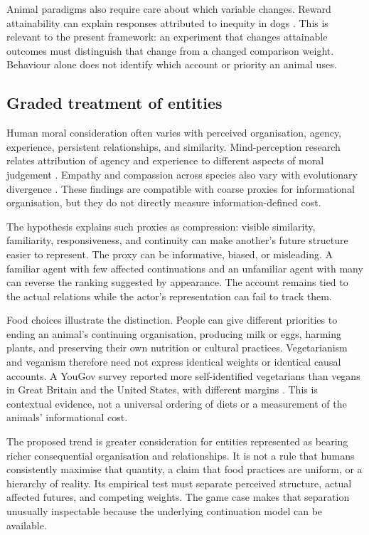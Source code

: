 \documentclass[11pt,a4paper]{article}
\theoremstyle{remark}
\begin{document}
Animal paradigms also require care about which variable changes. Reward
attainability can explain responses attributed to inequity in dogs
\citep{mcgetrick2023attainability}. This is relevant to the present framework:
an experiment that changes attainable outcomes must distinguish that change
from a changed comparison weight. Behaviour alone does not identify which
account or priority an animal uses.

\subsection{Graded treatment of entities}

Human moral consideration often varies with perceived organisation, agency,
experience, persistent relationships, and similarity. Mind-perception research
relates attribution of agency and experience to different aspects of moral
judgement \citep{gray2007mindperception}. Empathy and compassion across species
also vary with evolutionary divergence \citep{miralles2019empathy}. These findings
are compatible with coarse proxies for informational organisation, but they do
not directly measure information-defined cost.

The hypothesis explains such proxies as compression: visible similarity,
familiarity, responsiveness, and continuity can make another's future structure
easier to represent. The proxy can be informative, biased, or misleading. A
familiar agent with few affected continuations and an unfamiliar agent with many
can reverse the ranking suggested by appearance. The account remains tied to
the actual relations while the actor's representation can fail to track them.

Food choices illustrate the distinction. People can give different priorities
to ending an animal's continuing organisation, producing milk or eggs, harming
plants, and preserving their own nutrition or cultural practices. Vegetarianism
and veganism therefore need not express identical weights or identical causal
accounts. A YouGov survey reported more self-identified vegetarians than vegans
in Great Britain and the United States, with different margins
\citep{nguyen2024dietarytrends}. This is contextual evidence, not a universal
ordering of diets or a measurement of the animals' informational cost.

The proposed trend is greater consideration for entities represented as bearing
richer consequential organisation and relationships. It is not a rule that
humans consistently maximise that quantity, a claim that food practices are
uniform, or a hierarchy of reality. Its empirical test must separate perceived
structure, actual affected futures, and competing weights. The game case makes
that separation unusually inspectable because the underlying continuation model
can be available.
\end{document}
